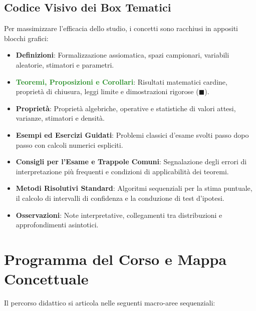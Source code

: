 \documentclass[11pt,a4paper,twoside,openright]{book}
\begin{document}
\section*{Codice Visivo dei Box Tematici}
Per massimizzare l'efficacia dello studio, i concetti sono racchiusi in appositi blocchi grafici:
\begin{itemize}
    \item \textbf{\textcolor{navyblue}{Definizioni}}: Formalizzazione assiomatica, spazi campionari, variabili aleatorie, stimatori e parametri.
    \item \textbf{\textcolor{forestgreen}{Teoremi, Proposizioni e Corollari}}: Risultati matematici cardine, proprietà di chiusura, leggi limite e dimostrazioni rigorose ($\blacksquare$).
    \item \textbf{\textcolor{tealaccent}{Proprietà}}: Proprietà algebriche, operative e statistiche di valori attesi, varianze, stimatori e densità.
    \item \textbf{\textcolor{purpleaccent}{Esempi ed Esercizi Guidati}}: Problemi classici d'esame svolti passo dopo passo con calcoli numerici espliciti.
    \item \textbf{\textcolor{crimsonred}{Consigli per l'Esame e Trappole Comuni}}: Segnalazione degli errori di interpretazione più frequenti e condizioni di applicabilità dei teoremi.
    \item \textbf{\textcolor{warmamber}{Metodi Risolutivi Standard}}: Algoritmi sequenziali per la stima puntuale, il calcolo di intervalli di confidenza e la conduzione di test d'ipotesi.
    \item \textbf{\textcolor{navyblue!80}{Osservazioni}}: Note interpretative, collegamenti tra distribuzioni e approfondimenti asintotici.
\end{itemize}

\cleardoublepage

\chapter*{Programma del Corso e Mappa Concettuale}

Il percorso didattico si articola nelle seguenti macro-aree sequenziali:
\end{document}
